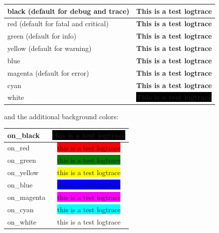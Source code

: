 \begin{center}
\begin{tabular}{|l || c|}
\hline
 black (default for debug and trace) & {\color{black} \textbf{This is a test logtrace}} \\ 
\hline
 red (default for fatal and critical) & {\color{red} \textbf{This is a test logtrace}} \\ 
\hline
 green (default for info) & {\color{green} \textbf{This is a test logtrace}} \\ 
\hline
yellow (default for warning) & {\color{yellow} \textbf{This is a test logtrace}} \\ 
\hline
 blue & {\color{blue} \textbf{This is a test logtrace}} \\ 
\hline 
magenta (default for error) & {\color{magenta} \textbf{This is a test logtrace}} \\ 
\hline
 cyan & {\color{cyan} \textbf{This is a test logtrace}} \\ 
\hline 
white & \colorbox{black}{\color{white}\textbf{This is a test logtrace}} \\
\hline
\end{tabular}
\end{center}

and the additional background colors:
\begin{center}
\begin{tabular}{|l | c |}
  \hline
 on\_black & \colorbox{black}{\color{green}this is a test logtrace} \\
 \hline
 on\_red & \colorbox{red}{this is a test logtrace} \\
 \hline
on\_green & \colorbox{green}{this is a test logtrace} \\
 \hline
on\_yellow & \colorbox{yellow}{this is a test logtrace} \\
 \hline
 on\_blue & \colorbox{blue}{this is a test logtrace} \\
 \hline
 on\_magenta & \colorbox{magenta}{this is a test logtrace} \\
 \hline 
on\_cyan & \colorbox{cyan}{this is a test logtrace} \\
 \hline 
on\_white & \colorbox{white}{this is a test logtrace} \\
\hline
\end{tabular}
\end{center}

